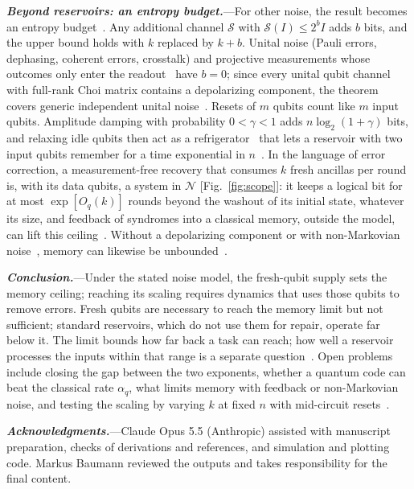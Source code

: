 \documentclass[aps,prl,twocolumn,superscriptaddress,floatfix]{revtex4-2}
\theoremstyle{plain}
\newcommand{\runin}[1]{\textit{\textbf{#1}}---}
\begin{document}
\runin{Beyond reservoirs: an entropy budget.}For other noise, the result becomes an entropy budget~\cite{SM}. Any additional channel $\mathcal S$ with $\mathcal S(I)\le2^bI$ adds $b$ bits, and the upper bound holds with $k$ replaced by $k+b$. Unital noise (Pauli errors, dephasing, coherent errors, crosstalk) and projective measurements whose outcomes only enter the readout~\cite{Mujal2023} have $b=0$; since every unital qubit channel with full-rank Choi matrix contains a depolarizing component, the theorem covers generic independent unital noise~\cite{SM}. Resets of $m$ qubits count like $m$ input qubits. Amplitude damping with probability $0<\gamma<1$ adds $n\log_2(1+\gamma)$ bits, and relaxing idle qubits then act as a refrigerator~\cite{BenOr2013} that lets a reservoir with two input qubits remember for a time exponential in $n$~\cite{SM,Hoeffding1963}. In the language of error correction, a measurement-free recovery that consumes $k$ fresh ancillas per round is, with its data qubits, a system in $\mathcal N$ [Fig.~\ref{fig:scope}]: it keeps a logical bit for at most $\exp[O_q(k)]$ rounds beyond the washout of its initial state, whatever its size, and feedback of syndromes into a classical memory, outside the model, can lift this ceiling~\cite{SM}. Without a depolarizing component or with non-Markovian noise~\cite{Sannia2026}, memory can likewise be unbounded~\cite{SM}.

\runin{Conclusion.}Under the stated noise model, the fresh-qubit supply sets the memory ceiling; reaching its scaling requires dynamics that uses those qubits to remove errors. Fresh qubits are necessary to reach the memory limit but not sufficient; standard reservoirs, which do not use them for repair, operate far below it. The limit bounds how far back a task can reach; how well a reservoir processes the inputs within that range is a separate question~\cite{Cao2026}. Open problems include closing the gap between the two exponents, whether a quantum code can beat the classical rate $\alpha_q$, what limits memory with feedback or non-Markovian noise, and testing the scaling by varying $k$ at fixed $n$ with mid-circuit resets~\cite{Yasuda2023,Hu2024}.

\begin{acknowledgments}
\runin{Acknowledgments.}Claude Opus 5.5 (Anthropic) assisted with manuscript preparation, checks of derivations and references, and simulation and plotting code. Markus Baumann reviewed the outputs and takes responsibility for the final content.
\end{acknowledgments}
\end{document}
